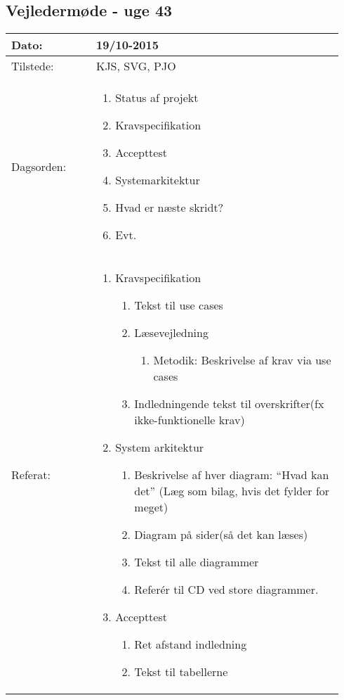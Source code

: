 	\subsection{Vejledermøde - uge 43} \label{app:vejlederuge43}
	\begin{longtable}{|p{0.24\linewidth}|p{0.7\linewidth}|}
		\hline
		Dato: & 19/10-2015\\ \hline
		Tilstede: & KJS, SVG, PJO\\ \hline
		Dagsorden: &
		\begin{enumerate}
			\item Status af projekt
			\item Kravspecifikation
			\item Accepttest
			\item Systemarkitektur
			\item Hvad er næste skridt? 
			\item Evt. 
		\end{enumerate}
		\\ \hline
		Referat: & 
		\begin{enumerate}
			\item Kravspecifikation 
			\begin{enumerate}
				\item Tekst til use cases 
				\item Læsevejledning
				\begin{enumerate}
					\item Metodik: Beskrivelse af krav via use cases
				\end{enumerate}
				\item Indledningende tekst til overskrifter(fx ikke-funktionelle krav) 
			\end{enumerate}
			\item System arkitektur
			\begin{enumerate}
				\item Beskrivelse af hver diagram: “Hvad kan det” (Læg som bilag, hvis det fylder for meget) 
				\item Diagram på sider(så det kan læses) 
				\item Tekst til alle diagrammer 
				\item Referér til CD ved store diagrammer. 
			\end{enumerate}
			\item Accepttest
			\begin{enumerate}
				\item Ret afstand indledning
				\item Tekst til tabellerne

\end{enumerate}
\end{enumerate}
\end{longtable}
